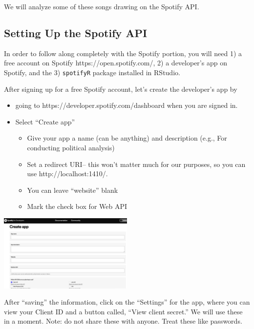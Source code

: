 \documentclass[
  letterpaper,
  DIV=11,
  numbers=noendperiod]{scrreprt}
\providecommand{\tightlist}{%
  \setlength{\itemsep}{0pt}\setlength{\parskip}{0pt}}\usepackage{longtable,booktabs,array}
\begin{document}
We will analyze some of these songs drawing on the Spotify API.

\hypertarget{setting-up-the-spotify-api}{%
\subsection{Setting Up the Spotify
API}\label{setting-up-the-spotify-api}}

In order to follow along completely with the Spotify portion, you will
need 1) a free account on Spotify https://open.spotify.com/, 2) a
developer's app on Spotify, and the 3) \texttt{spotifyR} package
installed in RStudio.

After signing up for a free Spotify account, let's create the
developer's app by

\begin{itemize}
\tightlist
\item
  going to https://developer.spotify.com/dashboard when you are signed
  in.
\item
  Select ``Create app''

  \begin{itemize}
  \tightlist
  \item
    Give your app a name (can be anything) and description (e.g., For
    conducting political analysis)
  \item
    Set a redirect URI-- this won't matter much for our purposes, so you
    can use http://localhost:1410/.
  \item
    You can leave ``website'' blank
  \item
    Mark the check box for Web API
  \end{itemize}
\end{itemize}

\includegraphics[width=0.5\textwidth,height=\textheight]{images/spotapi.png}

After ``saving'' the information, click on the ``Settings'' for the app,
where you can view your Client ID and a button called, ``View client
secret.'' We will use these in a moment. Note: do not share these with
anyone. Treat these like passwords.
\end{document}
